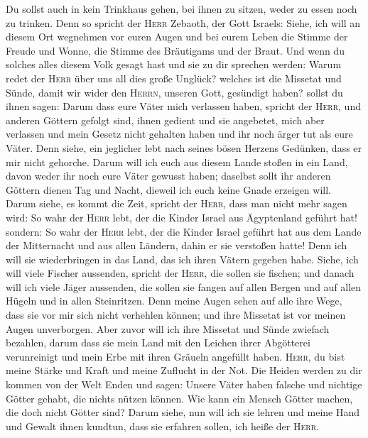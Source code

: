  Du sollst auch in kein Trinkhaus gehen, bei ihnen zu
sitzen, weder zu essen noch zu trinken.  Denn so spricht
der \textsc{Herr} Zebaoth, der Gott Israels: Siehe, ich will an diesem
Ort wegnehmen vor euren Augen und bei eurem Leben die Stimme der Freude
und Wonne, die Stimme des Bräutigams und der Braut.  Und
wenn du solches alles diesem Volk gesagt hast und sie zu dir sprechen
werden: Warum redet der \textsc{Herr} über uns all dies große Unglück?
welches ist die Missetat und Sünde, damit wir wider den \textsc{Herrn},
unseren Gott, gesündigt haben?  sollst du ihnen sagen:
Darum dass eure Väter mich verlassen haben, spricht der \textsc{Herr},
und anderen Göttern gefolgt sind, ihnen gedient und sie angebetet, mich
aber verlassen und mein Gesetz nicht gehalten haben  und
ihr noch ärger tut als eure Väter. Denn siehe, ein jeglicher lebt nach
seines bösen Herzens Gedünken, dass er mir nicht gehorche.
 Darum will ich euch aus diesem Lande stoßen in ein Land,
davon weder ihr noch eure Väter gewusst haben; daselbst sollt ihr
anderen Göttern dienen Tag und Nacht, dieweil ich euch keine Gnade
erzeigen will.  Darum siehe, es kommt die Zeit, spricht
der \textsc{Herr}, dass man nicht mehr sagen wird: So wahr der
\textsc{Herr} lebt, der die Kinder Israel aus Ägyptenland geführt hat!
 sondern: So wahr der \textsc{Herr} lebt, der die Kinder
Israel geführt hat aus dem Lande der Mitternacht und aus allen Ländern,
dahin er sie verstoßen hatte! Denn ich will sie wiederbringen in das
Land, das ich ihren Vätern gegeben habe.  Siehe, ich will
viele Fischer aussenden, spricht der \textsc{Herr}, die sollen sie
fischen; und danach will ich viele Jäger aussenden, die sollen sie
fangen auf allen Bergen und auf allen Hügeln und in allen Steinritzen.
 Denn meine Augen sehen auf alle ihre Wege, dass sie vor
mir sich nicht verhehlen können; und ihre Missetat ist vor meinen Augen
unverborgen.  Aber zuvor will ich ihre Missetat und Sünde
zwiefach bezahlen, darum dass sie mein Land mit den Leichen ihrer
Abgötterei verunreinigt und mein Erbe mit ihren Gräueln angefüllt haben.
 \textsc{Herr}, du bist meine Stärke und Kraft und meine
Zuflucht in der Not. Die Heiden werden zu dir kommen von der Welt Enden
und sagen: Unsere Väter haben falsche und nichtige Götter gehabt, die
nichts nützen können.  Wie kann ein Mensch Götter machen,
die doch nicht Götter sind?  Darum siehe, nun will ich
sie lehren und meine Hand und Gewalt ihnen kundtun, dass sie erfahren
sollen, ich heiße der \textsc{Herr}.

